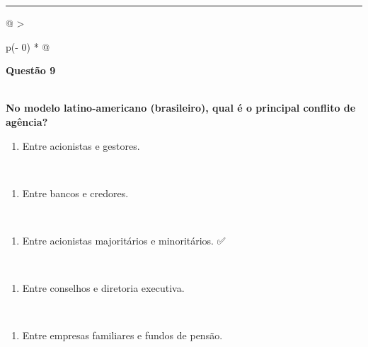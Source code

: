 \documentclass[
]{book}
\providecommand{\tightlist}{%
  \setlength{\itemsep}{0pt}\setlength{\parskip}{0pt}}
\begin{document}
\begin{center}\rule{0.5\linewidth}{0.5pt}\end{center}

\begin{longtable}[]{@{}
  >{\raggedright\arraybackslash}p{(\columnwidth - 0\tabcolsep) * }@{}}
\toprule\noalign{}
\begin{minipage}[b]{\linewidth}\raggedright
\textbf{Questão 9}
\end{minipage} \\
\midrule\noalign{}
\endhead
\bottomrule\noalign{}
\endlastfoot
\textbf{No modelo latino-americano (brasileiro), qual é o principal conflito de agência?} \\
\begin{minipage}[t]{\linewidth}\raggedright
\begin{enumerate}
\def\labelenumi{\alph{enumi})}
\tightlist
\item
  Entre acionistas e gestores.
\end{enumerate}
\end{minipage} \\
\begin{minipage}[t]{\linewidth}\raggedright
\begin{enumerate}
\def\labelenumi{\alph{enumi})}
\setcounter{enumi}{1}
\tightlist
\item
  Entre bancos e credores.
\end{enumerate}
\end{minipage} \\
\begin{minipage}[t]{\linewidth}\raggedright
\begin{enumerate}
\def\labelenumi{\alph{enumi})}
\setcounter{enumi}{2}
\tightlist
\item
  Entre acionistas majoritários e minoritários. ✅
\end{enumerate}
\end{minipage} \\
\begin{minipage}[t]{\linewidth}\raggedright
\begin{enumerate}
\def\labelenumi{\alph{enumi})}
\setcounter{enumi}{3}
\tightlist
\item
  Entre conselhos e diretoria executiva.
\end{enumerate}
\end{minipage} \\
\begin{minipage}[t]{\linewidth}\raggedright
\begin{enumerate}
\def\labelenumi{\alph{enumi})}
\setcounter{enumi}{4}
\tightlist
\item
  Entre empresas familiares e fundos de pensão.
\end{enumerate}
\end{minipage} \\
\end{longtable}
\end{document}

